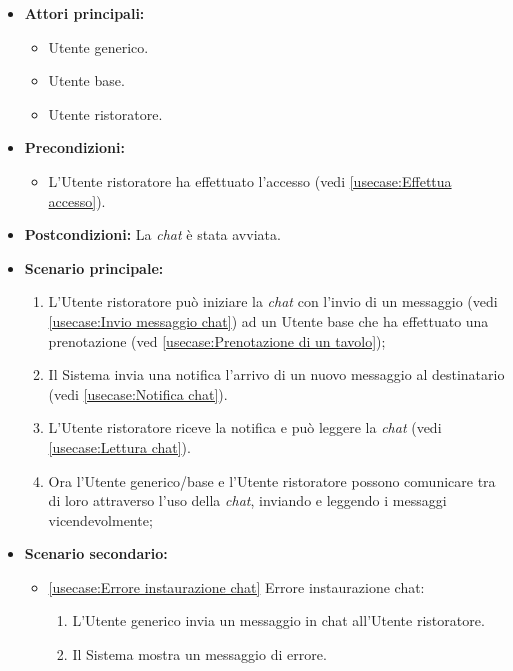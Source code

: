 \label{usecase:Chat Utente ristoratore}
\begin{itemize}
	\item \textbf{Attori principali:} 
	\begin{itemize}
        \item Utente generico.
        \item Utente base.
        \item Utente ristoratore.
    \end{itemize}

	\item \textbf{Precondizioni:}
	\begin{itemize}
        \item L'Utente ristoratore ha effettuato l'accesso (vedi \autoref{usecase:Effettua accesso}).
    \end{itemize}

	\item \textbf{Postcondizioni:} La \textit{chat} è stata avviata.

	\item \textbf{Scenario principale:}
            \begin{enumerate}
                \item L'Utente ristoratore può iniziare la \textit{chat} con l'invio di un messaggio (vedi \autoref{usecase:Invio messaggio chat}) ad un Utente base che ha effettuato una prenotazione (ved \autoref{usecase:Prenotazione di un tavolo});
                \item Il Sistema invia una notifica l'arrivo di un nuovo messaggio al destinatario (vedi \autoref{usecase:Notifica chat}).
                \item L'Utente ristoratore riceve la notifica e può leggere la \textit{chat} (vedi \autoref{usecase:Lettura chat}).
                \item Ora l'Utente generico/base e l'Utente ristoratore possono comunicare tra di loro attraverso l'uso della \textit{chat}, inviando e leggendo i messaggi vicendevolmente;
	      \end{enumerate}

    \item \textbf{Scenario secondario:}
		  \begin{itemize}
			  \item \autoref{usecase:Errore instaurazione chat} Errore instaurazione chat:
				\begin{enumerate}
					\item L'Utente generico invia un messaggio in chat all'Utente ristoratore.
					\item  Il Sistema mostra un messaggio di errore.
				\end{enumerate}
		  \end{itemize}
\end{itemize}